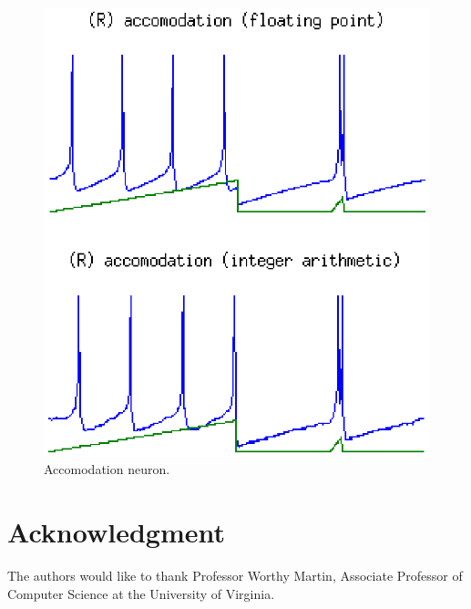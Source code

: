 \documentclass[journal]{./sty/IEEEtran}
\begin{document}
\begin{figure}
\centering
\includegraphics[scale=0.6]{imgs/izh_accomodation}
\caption{Accomodation neuron.}
\end{figure}


\section*{Acknowledgment}


The authors would like to thank Professor Worthy Martin, Associate Professor of Computer Science at the University of Virginia.


\ifCLASSOPTIONcaptionsoff
  \newpage
\fi



\end{document}

